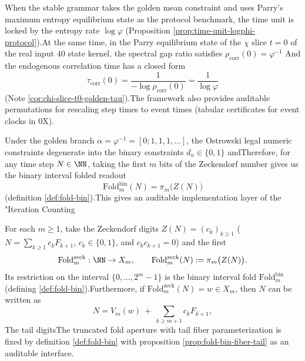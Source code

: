 \begin{enumerate}
\begin{corollary}  \label{cor:terminal-tau-corr-logphi}
When the stable grammar takes the golden mean constraint and uses Parry's maximum entropy equilibrium state as the protocol benchmark, the time unit is locked by the entropy rate \(\log\varphi\) (Proposition \ref{prop:time-unit-logphi-protocol}).At the same time, in the Parry equilibrium state of the \(\chi\) slice \(t=0\) of the real input \(40\) state kernel, the spectral gap ratio satisfies  \(
  \rho_{\mathrm{corr}}(0)=\varphi^{-1}
  \)
And the endogenous correlation time has a closed form  \[
  \tau_{\mathrm{corr}}(0)=\frac{1}{-\log\rho_{\mathrm{corr}}(0)}=\frac{1}{\log\varphi}
  \]
(Note \ref{cor:chi-slice-t0-golden-tau}).The framework also provides auditable permutations for rescaling step times to event times (tabular certificates for event clocks in \SXPH0X).  \end{corollary}

\begin{corollary}\label{cor:terminal-ostrowski-zeckendorf-binfold}Under the golden branch \(\alpha=\varphi^{-1}=[0;1,1,1,\dots]\), the Ostrowski legal numeric constraints degenerate into the binary constraints \(d_n\in\{0,1\}\) andTherefore, for any time step \(N\in\NN\), taking the first \(m\) bits of the Zeckendorf number gives us the binary interval folded readout  \[
  \mathrm{Fold}^{\mathrm{bin}}_m(N)=\pi_m\bigl(Z(N)\bigr)
  \]
(definition \ref{def:fold-bin}).This gives an auditable implementation layer of the "Iteration Counting  \end{corollary}

\begin{definition}\label{def:terminal-fold-zeck-extension}For each \(m\ge 1\), take the Zeckendorf digits \(Z(N)=(c_k)_{k\ge 1}\) (\(N=\sum_{k\ge 1}c_kF_{k+1}\), \(c_k\in\{0,1\}\), and \(c_kc_{k+1}=0\)) and the first  \[
  \mathrm{Fold}^{\mathrm{zeck}}_m:\NN\to X_m,\qquad
  \mathrm{Fold}^{\mathrm{zeck}}_m(N):=\pi_m\bigl(Z(N)\bigr).
  \]
Its restriction on the interval \(\{0,\dots,2^m-1\}\) is the binary interval fold \(\mathrm{Fold}^{\mathrm{bin}}_m\) (defining \ref{def:fold-bin}).Furthermore, if \(\mathrm{Fold}^{\mathrm{zeck}}_m(N)=w\in X_m\), then \(N\) can be written as  \[
  N=V_m(w)\ +\ \sum_{k\ge m+1} c_kF_{k+1},
  \]
The tail digitsThe truncated fold aperture with tail fiber parameterization is fixed by definition \ref{def:fold-bin} with proposition \ref{prop:fold-bin-fiber-tail} as an auditable interface.  \end{definition}


\end{enumerate}
